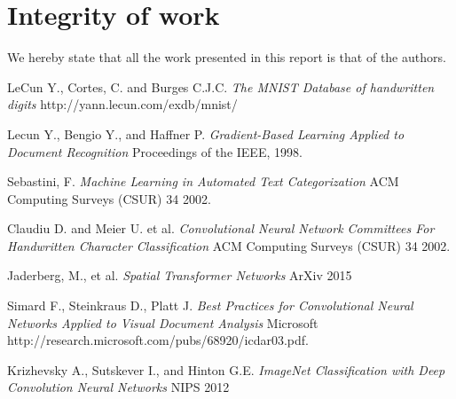 \documentclass[conference]{IEEEtran}
\begin{document}
\section{Integrity of work}
We hereby state that all the work presented in this report is that of the authors.
\begin{thebibliography}{9}

LeCun Y., Cortes, C. and Burges C.J.C.
	\emph{The MNIST Database of handwritten digits}
	http://yann.lecun.com/exdb/mnist/


Lecun Y., Bengio Y., and Haffner P.
 \emph{Gradient-Based Learning Applied to Document Recognition}
 Proceedings of the IEEE,
 1998.

 
 Sebastini, F.
  \emph{Machine Learning in Automated Text Categorization}
  ACM Computing Surveys (CSUR) 34
  2002.

 Claudiu D. and Meier U. et al.
  \emph{Convolutional Neural Network Committees For Handwritten Character
Classification}
  ACM Computing Surveys (CSUR) 34
  2002.

 Jaderberg, M., et al.
  \emph{Spatial Transformer Networks}
  ArXiv
  2015
  
  Simard F., Steinkraus D., Platt J.
  \emph{Best Practices for Convolutional Neural Networks
Applied to Visual Document Analysis}
	Microsoft
    http://research.microsoft.com/pubs/68920/icdar03.pdf.


Krizhevsky A., Sutskever I., and Hinton G.E.
\emph{ImageNet Classification with Deep Convolution Neural Networks}
	NIPS 2012

\end{thebibliography}
\end{document}
